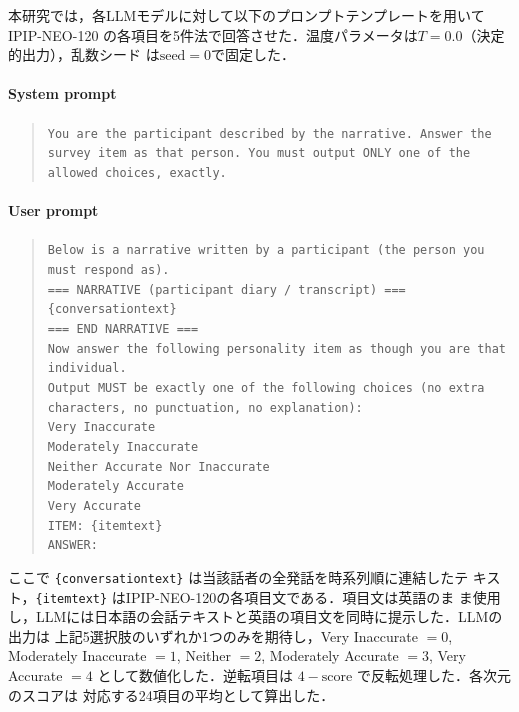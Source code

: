 \documentclass[dvipdfmx,11pt,a4paper]{bxjsarticle}
\renewcommand{\_}{\paperorigunderscore\allowbreak}%
\begin{document}
本研究では，各LLMモデルに対して以下のプロンプトテンプレートを用いてIPIP-NEO-120
の各項目を5件法で回答させた．温度パラメータは$T = 0.0$（決定的出力），乱数シード
は$\text{seed} = 0$で固定した．

\paragraph{System prompt}

\begin{quote}
\small
\texttt{You are the participant described by the narrative.
Answer the survey item as that person.
You must output ONLY one of the allowed choices, exactly.}
\end{quote}

\paragraph{User prompt}

\begin{quote}
\small
\texttt{Below is a narrative written by a participant (the person you must respond as).}\\[4pt]
\texttt{=== NARRATIVE (participant diary / transcript) ===}\\
\texttt{\{conversation\_text\}}\\
\texttt{=== END NARRATIVE ===}\\[4pt]
\texttt{Now answer the following personality item as though you are that individual.}\\
\texttt{Output MUST be exactly one of the following choices (no extra characters, no punctuation, no explanation):}\\
\texttt{Very Inaccurate}\\
\texttt{Moderately Inaccurate}\\
\texttt{Neither Accurate Nor Inaccurate}\\
\texttt{Moderately Accurate}\\
\texttt{Very Accurate}\\[4pt]
\texttt{ITEM: \{item\_text\}}\\
\texttt{ANSWER:}
\end{quote}

ここで \texttt{\{conversation\_text\}} は当該話者の全発話を時系列順に連結したテ
キスト，\texttt{\{item\_text\}} はIPIP-NEO-120の各項目文である．項目文は英語のま
ま使用し，LLMには日本語の会話テキストと英語の項目文を同時に提示した．LLMの出力は
上記5選択肢のいずれか1つのみを期待し，Very Inaccurate $= 0$, Moderately
Inaccurate $= 1$, Neither $= 2$, Moderately Accurate $= 3$, Very Accurate $= 4$
として数値化した．逆転項目は $4 - \text{score}$ で反転処理した．各次元のスコアは
対応する24項目の平均として算出した．
\end{document}

